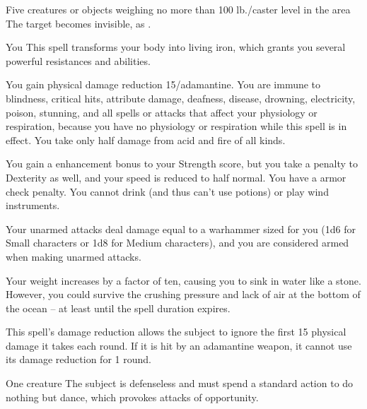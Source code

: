 \spelldur{\durshort \dismissable}
\begin{spelltargets}{Five creatures or objects weighing no more than 100 lb./caster level in the area}
    \spelleffect The target becomes invisible, as .
\end{spelltargets}

\spelldur{\durshort \dismissable}
\begin{spelltarget}{You}
    \spelleffect This spell transforms your body into living iron, which grants you several powerful resistances and abilities.
    \par You gain physical damage reduction 15/adamantine. You are immune to blindness, critical hits, attribute damage, deafness, disease, drowning, electricity, poison, stunning, and all spells or attacks that affect your physiology or respiration, because you have no physiology or respiration while this spell is in effect. You take only half damage from acid and fire of all kinds.
    \par You gain a  enhancement bonus to your Strength score, but you take a  penalty to Dexterity as well, and your speed is reduced to half normal. You have a  armor check penalty. You cannot drink (and thus can't use potions) or play wind instruments.
    \par Your unarmed attacks deal damage equal to a warhammer sized for you (1d6 for Small characters or 1d8 for Medium characters), and you are considered armed when making unarmed attacks.
    \par Your weight increases by a factor of ten, causing you to sink in water like a stone. However, you could survive the crushing pressure and lack of air at the bottom of the ocean -- at least until the spell duration expires.
\end{spelltarget}
\spellnotes This spell's damage reduction allows the subject to ignore the first 15 physical damage it takes each round. If it is hit by an adamantine weapon, it cannot use its damage reduction for 1 round.

\spellrng{\rngclose}
\begin{spelltarget}{One creature}
    \spelleffect The subject is defenseless and must spend a standard action to do nothing but dance, which provokes attacks of opportunity.
\end{spelltarget}

